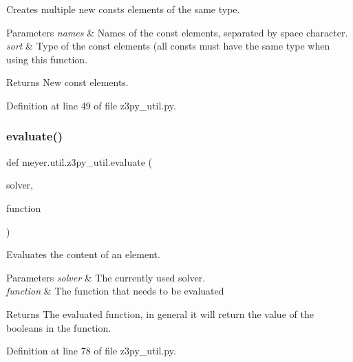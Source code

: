Creates multiple new consts elements of the same type. 


\begin{DoxyParams}{Parameters}
{\em names} & Names of the const elements, separated by space character. \\
\hline
{\em sort} & Type of the const elements (all consts must have the same type when using this function. \\
\hline
\end{DoxyParams}
\begin{DoxyReturn}{Returns}
New const elements. 
\end{DoxyReturn}


Definition at line 49 of file z3py\+\_\+util.\+py.

\mbox{\label{namespacemeyer_1_1util_1_1z3py__util_ad469c85dd6ea1c5d3641446ea0246166}} 
\subsubsection{\texorpdfstring{evaluate()}{evaluate()}}
{\footnotesize\ttfamily def meyer.\+util.\+z3py\+\_\+util.\+evaluate (\begin{DoxyParamCaption}\item[{}]{solver,  }\item[{}]{function }\end{DoxyParamCaption})}



Evaluates the content of an element. 


\begin{DoxyParams}{Parameters}
{\em solver} & The currently used solver. \\
\hline
{\em function} & The function that needs to be evaluated \\
\hline
\end{DoxyParams}
\begin{DoxyReturn}{Returns}
The evaluated function, in general it will return the value of the booleans in the function. 
\end{DoxyReturn}


Definition at line 78 of file z3py\+\_\+util.\+py.

\mbox{\label{namespacemeyer_1_1util_1_1z3py__util_a347859270b8ef0d7bb63d7840aa5f4aa}} 
